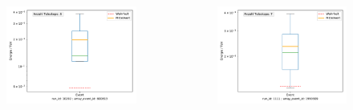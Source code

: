 \documentclass[aspectratio=1610, professionalfonts, 9pt]{beamer}
\begin{document}
  \begin{frame}
    \begin{columns}
      \begin{figure}
        \includegraphics[width=\textwidth]{pictures/pred2.pdf}
        \caption{}
        \label{}
      \end{figure}
      \begin{figure}
        \includegraphics[width=\textwidth]{pictures/pred3.pdf}
        \caption{}
        \label{}
      \end{figure}
    \end{columns}
  \end{frame}
\end{document}
